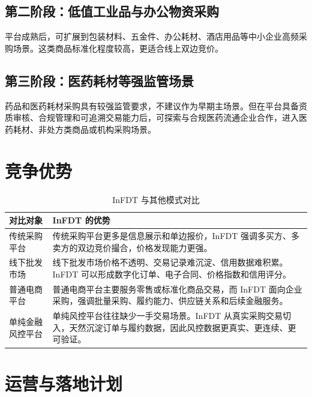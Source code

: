 \documentclass[UTF8,11pt]{ctexart}
\begin{document}
\subsection{第二阶段：低值工业品与办公物资采购}

平台成熟后，可扩展到包装材料、五金件、办公耗材、酒店用品等中小企业高频采购场景。这类商品标准化程度较高，更适合线上双边竞价。

\subsection{第三阶段：医药耗材等强监管场景}

药品和医药耗材采购具有较强监管要求，不建议作为早期主场景。但在平台具备资质审核、合规管理和可追溯交易能力后，可探索与合规医药流通企业合作，进入医药耗材、非处方类商品或机构采购场景。

\section{竞争优势}

\begin{table}[h]
    \centering
    \caption{InFDT 与其他模式对比}
    \begin{tabularx}{\textwidth}{p{3.5cm}Y}
        \toprule
        对比对象     & InFDT 的优势                                                        \\
        \midrule
        传统采购平台   & 传统采购平台更多是信息展示和单边报价，InFDT 强调多买方、多卖方的双边竞价撮合，价格发现能力更强。              \\
        线下批发市场   & 线下批发市场价格不透明、交易记录难沉淀、信用数据难积累。InFDT 可以形成数字化订单、电子合同、价格指数和信用评分。      \\
        普通电商平台   & 普通电商平台主要服务零售或标准化商品交易，而 InFDT 面向企业采购，强调批量采购、履约能力、供应链关系和后续金融服务。    \\
        单纯金融风控平台 & 单纯风控平台往往缺少一手交易场景。InFDT 从真实采购交易切入，天然沉淀订单与履约数据，因此风控数据更真实、更连续、更可验证。 \\
        \bottomrule
    \end{tabularx}
\end{table}

\section{运营与落地计划}
\end{document}

